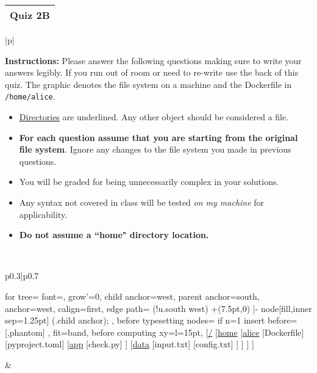 \documentclass[11pt]{article}
\begin{document}
\begin{tabularx}{\textwidth}{X}
\textbf{Quiz 2B} \\
\hline
\end{tabularx}


\begin{table}[h]
\centering
{} %
\begin{tabular}{|p{\textwidth}|}
\hline
\begin{minipage}[t]{\textwidth}
\vspace{0pt}  %
\noindent \textbf{Instructions:} Please answer the following questions making sure to write your answers legibly. If you run out of room or need to re-write use the back of this quiz. The graphic denotes the file system on a machine and the Dockerfile in \texttt{/home/alice}.
\begin{itemize}
    \item \underline{Directories} are underlined. Any other object should be considered a file.
    \item \textbf{For each question assume that you are starting from the original file system}. Ignore any changes to the file system you made in previous questions.
    \item You will be graded for being unnecessarily complex in your solutions. 
    \item Any syntax not covered in class will be tested \emph{on my machine} for applicability.
    \item \textbf{Do not assume a ``home" directory location.}
\end{itemize}


\end{minipage} \\
\hline
\begin{tabular}{p{0.3\textwidth}|p{0.7\textwidth}}
\begin{minipage}[t]{\linewidth}
\vspace{0pt}  %
\begin{forest}
  for tree={
    font=\ttfamily,
    grow'=0,
    child anchor=west,
    parent anchor=south,
    anchor=west,
    calign=first,
    edge path={
      \noexpand{}
      (!u.south west) +(7.5pt,0) |- node[fill,inner sep=1.25pt] {} (.child anchor);
    },
    before typesetting nodes={
      if n=1
        {insert before={[,phantom]}}
        {}
    },
    fit=band,
    before computing xy={l=15pt},
  }
[\underline{/}
  [\underline{home}
    [\underline{alice}
      [Dockerfile]
      [pyproject.toml]
      [\underline{app}
        [check.py]
      ]
      [\underline{data}
        [input.txt]
        [config.txt]
      ]
    ]
  ]
]
\end{forest}
\end{minipage}
&
\begin{minipage}[t]{\linewidth}
\vspace{0pt}  %


\end{minipage}
\end{tabular}
\end{tabular}
\end{table}
\end{document}

